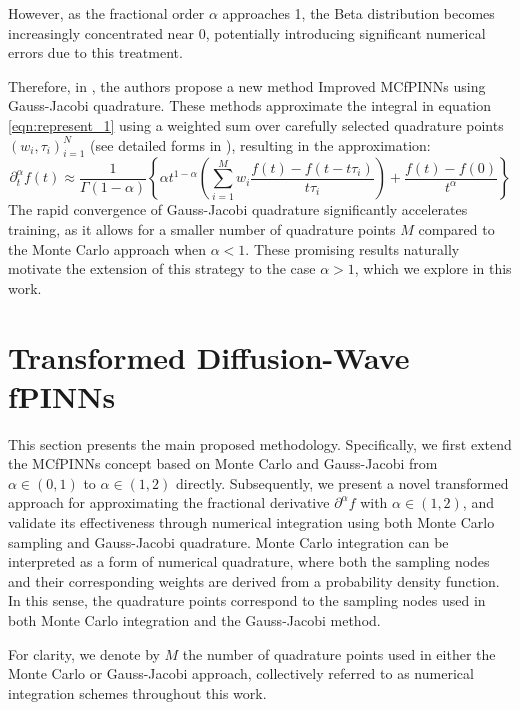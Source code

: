 \documentclass[preprint,3p,times]{elsarticle}
\def\al{\alpha}
\def\al{\alpha}
\def\dta{\partial_t^\alpha}
\begin{document}
However, as the fractional order $\al$ approaches 1, the Beta distribution becomes increasingly concentrated near 0, potentially introducing significant numerical errors due to this treatment. 

Therefore, in \cite{Hu2024:CMAME, Lin2025}, the authors propose a new method Improved MCfPINNs using Gauss-Jacobi quadrature. These methods approximate the integral in equation \eqref{eqn:represent_1} using a weighted sum over carefully selected quadrature points $(w_i,\tau_i)_{i=1}^N$ (see detailed forms in \cite{GJ2018}), resulting in the approximation:
\begin{equation}
    \label{eqn:IMCfd}
    \dta f(t) \approx \frac{1}{\Gamma(1-\al)}\left\{\al t^{1-\al} \left(\sum_{i=1}^M w_i \frac{f(t)-f(t-t\tau_i)}{t\tau_i}\right)+\frac{f(t)-f(0)}{t^\al}\right\}
\end{equation}
The rapid convergence of Gauss-Jacobi quadrature \cite{Chernov2012} significantly accelerates training, as it allows for a smaller number of quadrature points $M$ compared to the Monte Carlo approach when $\alpha<1$. These promising results naturally motivate the extension of this strategy to the case $\alpha>1$, which we explore in this work.

\section{Transformed Diffusion-Wave fPINNs}
\label{sec:methodology}
This section presents the main proposed methodology. Specifically, we first extend the MCfPINNs concept based on Monte Carlo and Gauss-Jacobi from $\alpha\in(0,1)$ to $\alpha \in (1, 2)$ directly. Subsequently, we present a novel transformed approach for approximating the fractional derivative $\partial^\alpha f$ with $\alpha \in (1, 2)$, and validate its effectiveness through numerical integration using both Monte Carlo sampling and Gauss-Jacobi quadrature. Monte Carlo integration can be interpreted as a form of numerical quadrature, where both the sampling nodes and their corresponding weights are derived from a probability density function. In this sense, the quadrature points correspond to the sampling nodes used in both Monte Carlo integration and the Gauss-Jacobi method.

For clarity, we denote by $M$ the number of quadrature points used in either the Monte Carlo or Gauss-Jacobi approach, collectively referred to as numerical integration schemes throughout this work.
\end{document}

